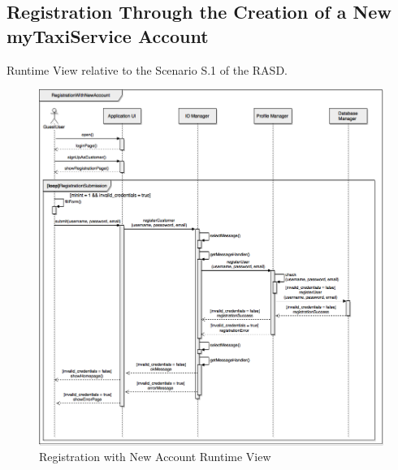 \documentclass[../../../../../../dd.tex]{subfiles}
\begin{document}
	\subsection{Registration Through the Creation of a New myTaxiService Account}
	\label{subsec:RegistrationNewAccount}
		Runtime View relative to the Scenario S.1 of the RASD.
		\begin{figure}[H]
				\centering
				\includegraphics[width=\textwidth, scale=0.5]{../images/SequenceDiagrams/registrationNewAccount.png}
			\caption{Registration with New Account Runtime View}\label{fig:RuntimeRegistrationNewAccount}
		\end{figure}
\end{document}
